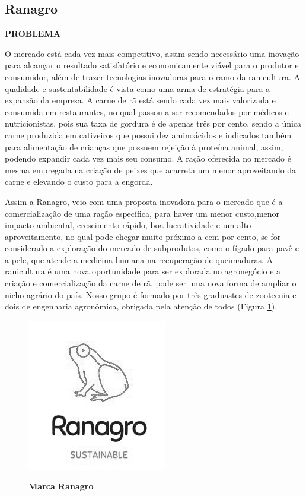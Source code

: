 \subsection{Ranagro}

\textbf{PROBLEMA}

O mercado está cada vez mais competitivo, assim sendo necessário uma inovação para alcançar o resultado satisfatório e economicamente viável para o produtor e consumidor, além de trazer tecnologias inovadoras para o ramo da ranicultura. A qualidade e sustentabilidade é vista como uma arma de estratégia para a expansão da empresa. A carne de rã está sendo cada vez mais valorizada e consumida em restaurantes, no qual passou a ser recomendados por médicos e nutricionistas, pois sua taxa de gordura é de apenas três por cento, sendo a única carne produzida em cativeiros que possui dez aminoácidos e indicados também para alimentação de crianças que possuem rejeição à proteína animal, assim, podendo expandir cada vez mais seu consumo. A ração oferecida no mercado é mesma empregada na criação de peixes que acarreta um menor aproveitando da carne e elevando o custo para a engorda.

Assim a Ranagro, veio com uma proposta inovadora para o mercado que é a comercialização de uma ração específica, para haver um menor custo,menor impacto ambiental, crescimento rápido, boa lucratividade e um alto aproveitamento, no qual pode chegar muito próximo a cem por cento, se for considerado a exploração do mercado de subprodutos, como o fígado para pavê e a pele, que atende a medicina humana na recuperação de queimaduras. A ranicultura é uma nova oportunidade para ser explorada no agronegócio e a criação e comercialização da carne de rã, pode ser uma nova forma de ampliar o nicho agrário do país. Nosso grupo é formado por três graduastes de zootecnia e dois de engenharia agronômica, obrigada pela atenção de todos (Figura \ref{figura_26}).



\begin{figure}[H]
\centering
\caption{\textbf{Marca Ranagro}}
\includegraphics[scale=0.7]{Imagens/ranagro.png}
\label{figura_26}
\end{figure}



